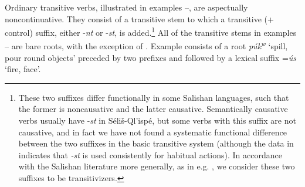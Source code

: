 \documentclass[output=paper,colorlinks,citecolor=brown]{langscibook}
\begin{document}
  Ordinary transitive verbs, illustrated in examples --, are aspectually
  noncontinuative.  They consist of a transitive stem to which a
  transitive (+ control) suffix, either -\emph{nt} or -\emph{st}, is
  added.\footnote{These two suffixes differ functionally in some
  Salishan languages, such that the former is noncausative and the
  latter causative.  Semantically causative verbs usually have
  -\emph{st} in S\'eli\v{s}-Ql'isp\'e, but some verbs with this
  suffix are not causative, and in fact we have not found a
  systematic functional difference between the two suffixes in the
  basic transitive system (although the data in
   indicates that \emph{-st} is used
  consistently for habitual actions). In accordance with the Salishan
  literature more generally, as in
  e.g. , we consider these
  two suffixes to be transitivizers.}  All of the transitive stems in
  examples -- are bare roots, with the exception of .  Example  consists
  of a root \emph{p\'uk\textsuperscript w} `spill, pour round
  objects' preceded by two prefixes and followed by a lexical suffix
  =\emph{\'us} `fire, face'.
\end{document}
